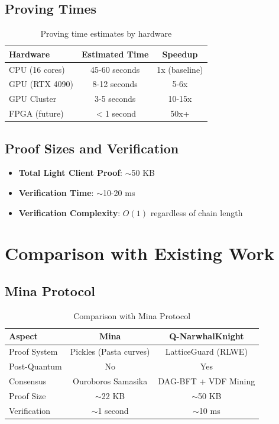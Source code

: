 \documentclass[11pt,a4paper]{article}
\begin{document}
\subsection{Proving Times}

\begin{table}[h]
\centering
\begin{tabular}{lcc}
\toprule
\textbf{Hardware} & \textbf{Estimated Time} & \textbf{Speedup} \\
\midrule
CPU (16 cores) & 45-60 seconds & 1x (baseline) \\
GPU (RTX 4090) & 8-12 seconds & 5-6x \\
GPU Cluster & 3-5 seconds & 10-15x \\
FPGA (future) & $<$1 second & 50x+ \\
\bottomrule
\end{tabular}
\caption{Proving time estimates by hardware}
\end{table}

\subsection{Proof Sizes and Verification}

\begin{itemize}
    \item \textbf{Total Light Client Proof}: $\sim$50 KB
    \item \textbf{Verification Time}: $\sim$10-20 ms
    \item \textbf{Verification Complexity}: $O(1)$ regardless of chain length
\end{itemize}

\section{Comparison with Existing Work}

\subsection{Mina Protocol}

\begin{table}[h]
\centering
\begin{tabular}{lcc}
\toprule
\textbf{Aspect} & \textbf{Mina} & \textbf{Q-NarwhalKnight} \\
\midrule
Proof System & Pickles (Pasta curves) & LatticeGuard (RLWE) \\
Post-Quantum & No & Yes \\
Consensus & Ouroboros Samasika & DAG-BFT + VDF Mining \\
Proof Size & $\sim$22 KB & $\sim$50 KB \\
Verification & $\sim$1 second & $\sim$10 ms \\
\bottomrule
\end{tabular}
\caption{Comparison with Mina Protocol}
\end{table}
\end{document}
